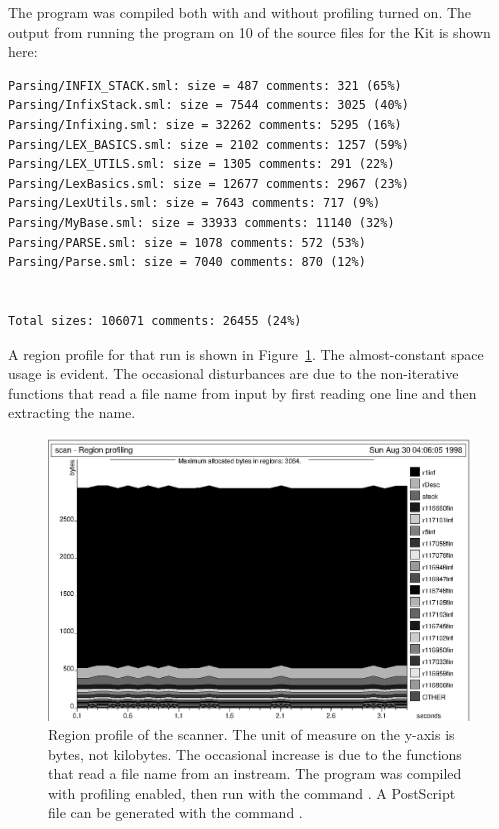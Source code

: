\documentclass[12pt]{book}
\begin{document}
The program was compiled both with and without profiling turned on.
The output from running the program on 10 of the source files for the
Kit is shown here:
\begin{verbatim}
Parsing/INFIX_STACK.sml: size = 487 comments: 321 (65%)
Parsing/InfixStack.sml: size = 7544 comments: 3025 (40%)
Parsing/Infixing.sml: size = 32262 comments: 5295 (16%)
Parsing/LEX_BASICS.sml: size = 2102 comments: 1257 (59%)
Parsing/LEX_UTILS.sml: size = 1305 comments: 291 (22%)
Parsing/LexBasics.sml: size = 12677 comments: 2967 (23%)
Parsing/LexUtils.sml: size = 7643 comments: 717 (9%)
Parsing/MyBase.sml: size = 33933 comments: 11140 (32%)
Parsing/PARSE.sml: size = 1078 comments: 572 (53%)
Parsing/Parse.sml: size = 7040 comments: 870 (12%)


Total sizes: 106071 comments: 26455 (24%)
\end{verbatim}
A region profile for that run is shown in Figure~\ref{scan.fig}.  The
almost-constant space usage is evident. The occasional disturbances
are due to the non-iterative functions that read a file name from
input by first reading one line and then extracting the name.
\begin{figure}
\begin{center}
\includegraphics{scan.ps}
\end{center}
\caption{Region profile of the scanner. The unit of measure on 
  the y-axis is bytes, not kilobytes. The occasional increase is due
  to the functions that read a file name from an instream.  The
  program was compiled with profiling enabled, then run with the
  command . A
  PostScript file  can be generated with the command
  .  }
\label{scan.fig}
\end{figure}
%
%
\end{document}
